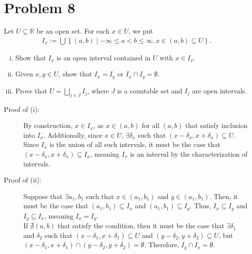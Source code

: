 \documentclass[8pt]{extarticle}
\newcommand{\R}{\mathbb{R}}
\begin{document}
  \section{Problem 8}%
  Let $U\subseteq \R$ be an open set. For each $x\in U$, we put
  \begin{align*}
    I_x := \bigcup \left\{(a,b)\mid -\infty \leq a < b \leq \infty,x\in (a,b)\subseteq U\right\}.
  \end{align*}
  \begin{enumerate}[(i)]
    \item Show that $I_x$ is an open interval contained in $U$ with $x\in I_x$.
    \item Given $x,y\in U$, show that $I_x = I_y$ or $I_x \cap I_y = \emptyset$.
    \item Prove that $U = \bigsqcup_{j\in J}I_j$, where $J$ is a countable set and $I_j$ are open intervals.
  \end{enumerate}
  \begin{description}
    \item[Proof of (i):] By construction, $x\in I_x$, as $x\in (a,b)$ for all $(a,b)$ that satisfy inclusion into $I_x$. Additionally, since $x\in U$, $\exists \delta_x$ such that $(x-\delta_x,x+\delta_x)\subseteq U$. Since $I_x$ is the union of all such intervals, it must be the case that $(x-\delta_x,x+\delta_x)\subseteq I_x$, meaning $I_x$ is an interval by the characterization of intervals.
    \item[Proof of (ii):] Suppose that $\exists a_1,b_1$ such that $x\in (a_1,b_1)$ and $y\in (a_1,b_1)$. Then, it must be the case that $(a_1,b_1)\subseteq I_x$ and $(a_1,b_1)\subseteq I_y$. Thus, $I_x\subseteq I_y$ and $I_y\subseteq I_x$, meaning $I_x = I_y$.\\

      If $\nexists (a,b)$ that satisfy the condition, then it must be the case that $\exists \delta_1$ and $\delta_2$ such that $(x-\delta_1,x+\delta_1)\subseteq U$ and $(y-\delta_2,y+\delta_2)\subseteq U$, but $(x-\delta_1,x+\delta_1)\cap (y-\delta_2,y+\delta_2) = \emptyset$. Therefore, $I_y \cap I_x = \emptyset$.
  \end{description}
\end{document}
